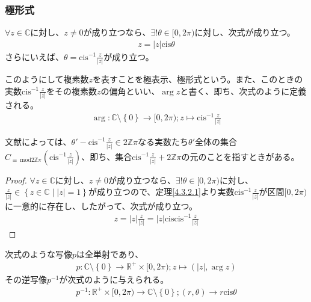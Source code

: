 \documentclass[dvipdfmx]{jsarticle}
\begin{document}
\subsubsection{極形式}%
\begin{thm}\label{4.3.2.3}
$\forall z \in \mathbb{C}$に対し、$z \neq 0$が成り立つなら、$\exists!\theta \in [ 0,2\pi)$に対し、次式が成り立つ。
\begin{align*}
z = |z|{\mathrm{cis}}\theta
\end{align*}
さらにいえば、$\theta = {\mathrm{cis}}^{- 1}\frac{z}{|z|}$が成り立つ。
\end{thm}
\begin{dfn}
このようにして複素数$z$を表すことを極表示、極形式という。また、このときの実数${\mathrm{cis}}^{- 1}\frac{z}{|z|}$をその複素数$z$の偏角といい、$\arg z$と書く、即ち、次式のように定義される。
\begin{align*}
\arg:\mathbb{C} \setminus \left\{ 0 \right\} \rightarrow [ 0,2\pi);z \mapsto {\mathrm{cis}}^{- 1}\frac{z}{|z|}
\end{align*}
\end{dfn}\par
文献によっては、$\theta' - {\mathrm{cis}}^{- 1}\frac{z}{|z|} \in 2\mathbb{Z}\pi$なる実数たち$\theta'$全体の集合$C_{\equiv \ \mathrm{mod}{2\mathbb{Z}\pi}}\left( {\mathrm{cis}}^{- 1}\frac{z}{|z|} \right)$、即ち、集合${\mathrm{cis}}^{- 1}\frac{z}{|z|} + 2\mathbb{Z}\pi$の元のことを指すときがある。
\begin{proof}
$\forall z \in \mathbb{C}$に対し、$z \neq 0$が成り立つなら、$\exists!\theta \in [ 0,2\pi)$に対し、$\frac{z}{|z|} \in \left\{ z \in \mathbb{C} \middle| |z| = 1 \right\}$が成り立つので、定理\ref{4.3.2.1}より実数${\mathrm{cis}}^{- 1}\frac{z}{|z|}$が区間$[ 0,2\pi)$に一意的に存在し、したがって、次式が成り立つ。
\begin{align*}
z = |z|\frac{z}{|z|} = |z|{\mathrm{cis}}{{\mathrm{cis}}^{- 1}\frac{z}{|z|}}
\end{align*}
\end{proof}
\begin{thm}\label{4.3.2.4} 次式のような写像$p$は全単射であり、
\begin{align*}
p:\mathbb{C} \setminus \left\{ 0 \right\} \rightarrow \mathbb{R}^{+} \times [ 0,2\pi);z \mapsto \left( |z|,\arg z \right)
\end{align*}
その逆写像$p^{- 1}$が次式のように与えられる。
\begin{align*}
p^{- 1}:\mathbb{R}^{+} \times [ 0,2\pi) \rightarrow \mathbb{C} \setminus \left\{ 0 \right\};(r,\theta) \rightarrow r{\mathrm{cis}}\theta
\end{align*}
\end{thm}
\end{document}
